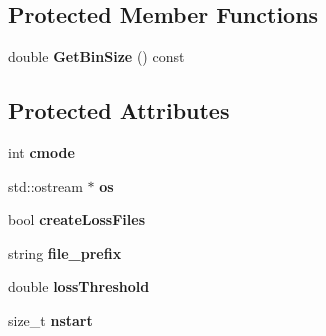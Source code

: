 \subsection*{Protected Member Functions}
\begin{DoxyCompactItemize}
\item 
\mbox{\label{classParticleTracking_1_1CollimateParticleProcess_adc2ef32a6f444a0083b4e44d23441503}} 
double {\bfseries Get\+Bin\+Size} () const
\end{DoxyCompactItemize}
\subsection*{Protected Attributes}
\begin{DoxyCompactItemize}
\item 
\mbox{\label{classParticleTracking_1_1CollimateParticleProcess_afee90888d5dc01760302786c74ebb5b1}} 
int {\bfseries cmode}
\item 
\mbox{\label{classParticleTracking_1_1CollimateParticleProcess_a1ad8e990f6603de53341ddf8810a5ce0}} 
std\+::ostream $\ast$ {\bfseries os}
\item 
\mbox{\label{classParticleTracking_1_1CollimateParticleProcess_a248fe2a4e249f9f75a8905b2a6bf4584}} 
bool {\bfseries create\+Loss\+Files}
\item 
\mbox{\label{classParticleTracking_1_1CollimateParticleProcess_a80462e8bff6f6db8a6e3e0b41bdf2d1b}} 
string {\bfseries file\+\_\+prefix}
\item 
\mbox{\label{classParticleTracking_1_1CollimateParticleProcess_a3302a12aa91cf298e26d956a6addb6b3}} 
double {\bfseries loss\+Threshold}
\item 
\mbox{\label{classParticleTracking_1_1CollimateParticleProcess_aba22f330c790e143d7120066544e1dc0}} 
size\+\_\+t {\bfseries nstart}
\item 
\mbox{\label{classParticleTracking_1_1CollimateParticleProcess_a0ca088327b33f967861164ffbcecb151}} 

\end{DoxyCompactItemize}
